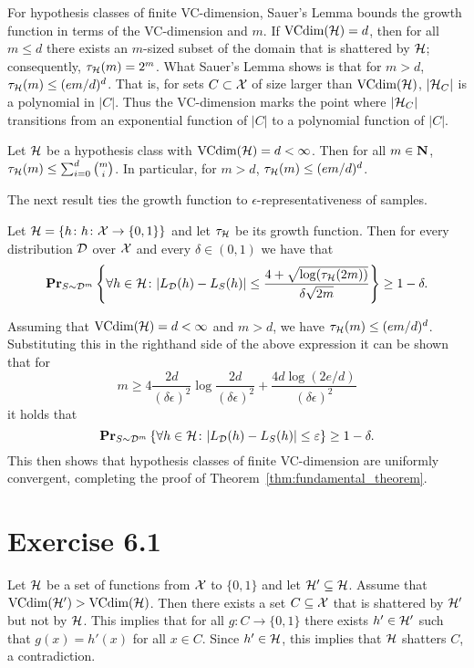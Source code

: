 For hypothesis classes of finite VC-dimension, Sauer's Lemma bounds the growth
function in terms of the VC-dimension and $m$. If $\text{VCdim}(\mathcal{H}) = d$, then for all
$m \leq d$ there exists an $m$-sized subset of the domain that is shattered by
$\mathcal{H}$; consequently, $\tau_{\mathcal{H}} (m) = 2^m$. What Sauer's Lemma shows
is that for $m > d$, $\tau_{\mathcal{H}} (m) \leq (em / d)^d$. That is, for sets
$C \subset \mathcal{X}$ of size larger than $\text{VCdim}(\mathcal{H})$, $|\mathcal{H}_{C}|$ is a
polynomial in $|C|$. Thus the VC-dimension marks the point where
$|\mathcal{H}_{C}|$ transitions from an exponential function of $|C|$ to a polynomial
function of $|C|$.
\begin{lemma}
Let $\mathcal{H}$ be a hypothesis class with $\text{VCdim}(\mathcal{H}) = d < \infty$.
Then for all $m \in \mathbf{N}$, $\tau_{\mathcal{H}}(m) \leq \sum_{i = 0}^{d} {m \choose i}$.
In particular, for $m > d$, $\tau_{\mathcal{H}}(m) \leq (e m / d)^d$.
\end{lemma}

The next result ties the growth function to $\epsilon$-representativeness of samples.
\begin{theorem}
Let $\mathcal{H} = \{h \colon h \colon \mathcal{X} \rightarrow \{0, 1\}\}$ and let
$\tau_{\mathcal{H}}$ be its growth function. Then for every distribution $\mathcal{D}$
over $\mathcal{X}$ and every $\delta \in (0, 1)$ we have that
\[
    \mathbf{Pr}_{S \sim \mathcal{D}^m} \left \{ \forall h \in \mathcal{H} \colon |L_{\mathcal{D}} (h) - L_S (h)|
             \leq \frac{4 + \sqrt{\log (\tau_{\mathcal{H}} ( 2m ))}}{ \delta \sqrt{2m}} \right \} \geq 1 - \delta.
\]
\end{theorem}
Assuming that $\text{VCdim}(\mathcal{H}) = d < \infty$ and $m > d$, we have
$\tau_{\mathcal{H}} (m) \leq (e m / d)^d$. Substituting this in the righthand side
of the above expression it can be shown that for
\[
    m \geq 4 \frac{2d}{ (\delta \epsilon)^2 } \log \frac{2d}{ (\delta \epsilon)^2 }
        + \frac{4 d \log (2 e / d)}{ (\delta \epsilon)^2 }
\]
it holds that
\[
    \mathbf{Pr}_{S \sim \mathcal{D}^m} \left \{ \forall h \in \mathcal{H} \colon |L_{\mathcal{D}} (h) - L_S (h)|
             \leq \varepsilon \right \} \geq 1 - \delta.
\]
This then shows that hypothesis classes of finite VC-dimension are uniformly
convergent, completing the proof of Theorem~\ref{thm:fundamental_theorem}.

\section*{Exercise 6.1}

Let $\mathcal{H}$ be a set of functions from $\mathcal{X}$ to $\{0, 1\}$ and
let $\mathcal{H}' \subseteq \mathcal{H}$. Assume that $\text{VCdim} (\mathcal{H}') > \text{VCdim}
(\mathcal{H})$.  Then there exists a set $C \subseteq \mathcal{X}$ that is shattered by
$\mathcal{H}'$ but not by $\mathcal{H}$.  This implies that for all $g \colon C
\rightarrow \{0, 1\}$ there exists $h' \in \mathcal{H}'$ such that $g(x) = h'(x)$
for all $x \in C$. Since $h' \in \mathcal{H}$, this implies that $\mathcal{H}$
shatters $C$, a contradiction.

